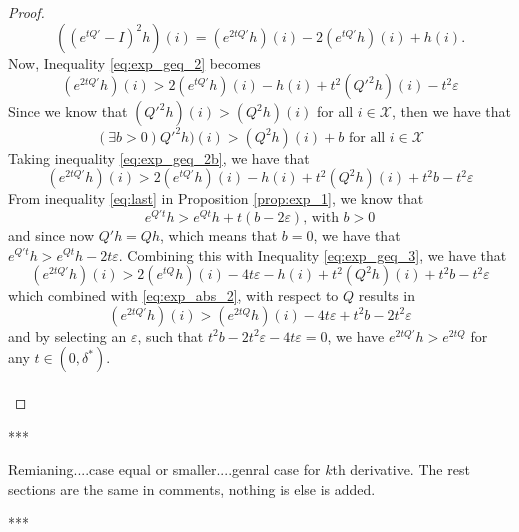 \documentclass{article}
\newcommand{\statessymbol}{\mathcal{X}}
\newcommand{\stateset}{\statessymbol}
\newcommand{\de}{\delta}
\newcommand{\ve}{\varepsilon}
\begin{document}
\begin{proof}
\begin{equation*}
((e^{tQ'}-I)^{2}h)(i)=(e^{2tQ'}h)(i)-2(e^{tQ'}h)(i)+h(i).
\end{equation*}
Now, Inequality \eqref{eq:exp_geq_2} becomes
\begin{equation} \label{eq:exp_geq_2b}
(e^{2tQ'}h)(i) > 2(e^{tQ'}h)(i)-h(i)+t^{2}(Q'^{2}h)(i)-t^{2}\ve 
\end{equation}
Since we know that $(Q'^{2}h)(i)>(Q^{2}h)(i)$ for all $i\in\stateset$, then we have that
\begin{equation} \label{eq:beta_2}
(\exists b>0) Q'^{2}h)(i)>(Q^{2}h)(i)+b \text{ for all } i\in\stateset
\end{equation} 
Taking inequality \eqref{eq:exp_geq_2b}, we have that
\begin{equation} \label{eq:exp_geq_3}
(e^{2tQ'}h)(i) > 2(e^{tQ'}h)(i)-h(i)+t^{2}(Q^{2}h)(i)+t^{2}b-t^{2}\ve 
\end{equation}
From inequality \eqref{eq:last} in Proposition \ref{prop:exp_1}, we know that
\begin{equation*} 
e^{Q't}h>e^{Qt}h+t(b-2\ve)\text{, with } b>0
\end{equation*}
and since now $Q'h=Qh$, which means that $b=0$, we have that $e^{Q't}h>e^{Qt}h-2t\ve$.
Combining this with Inequality \eqref{eq:exp_geq_3}, we have that
\begin{equation*} 
(e^{2tQ'}h)(i) > 2(e^{tQ}h)(i)-4t\ve-h(i)+t^{2}(Q^{2}h)(i)+t^{2}b-t^{2}\ve 
\end{equation*}
which combined with \eqref{eq:exp_abs_2}, with respect to $Q$ results in
\begin{equation} \label{eq:last_2}
(e^{2tQ'}h)(i) > (e^{2tQ}h)(i)-4t\ve+t^{2}b-2t^{2}\ve 
\end{equation}
and by selecting an $\ve$, such that $t^{2}b-2t^{2}\ve-4t\ve=0$, we have $e^{2tQ'}h>e^{2tQ}$ for any $t\in(0,\de^{*})$.\\\\
\end{proof}

***

Remianing....case equal or smaller....genral case for $k$th derivative.
The rest sections are the same in comments, nothing is else is added.

***
\end{document}
